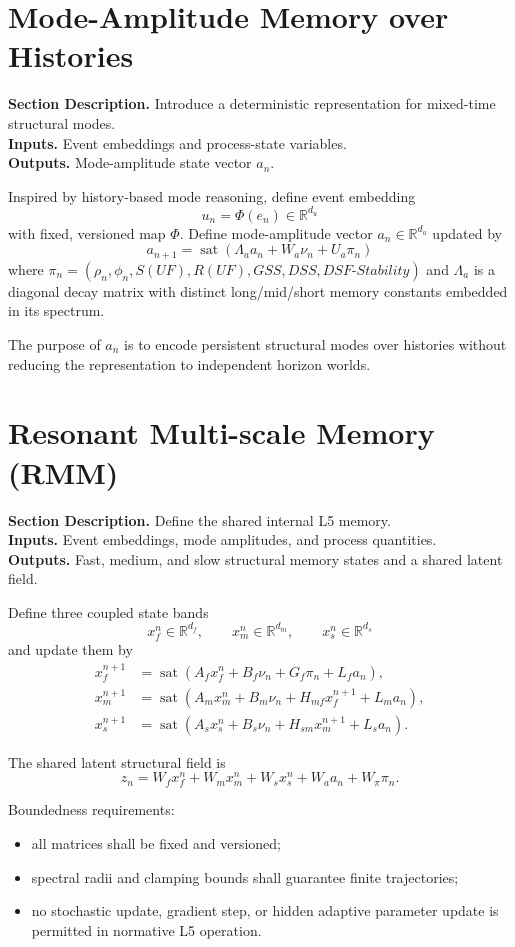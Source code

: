 \documentclass[11pt]{report}
\newcommand{\R}{\mathbb{R}}
\newcommand{\sat}{\operatorname{sat}}
\newcommand{\meta}[3]{\textbf{Section Description.} #1\\
\textbf{Inputs.} #2\\
\textbf{Outputs.} #3\par}
\begin{document}
\section{Mode-Amplitude Memory over Histories}
\meta{Introduce a deterministic representation for mixed-time structural modes.}{Event embeddings and process-state variables.}{Mode-amplitude state vector $a_n$.}

Inspired by history-based mode reasoning, define event embedding
\[
u_n = \Phi(e_n) \in \R^{d_u}
\]
with fixed, versioned map $\Phi$. Define mode-amplitude vector $a_n\in\R^{d_a}$ updated by
\[
a_{n+1} = \sat(\Lambda_a a_n + W_a \nu_n + U_a \pi_n)
\]
where $\pi_n=(\rho_n,\phi_n,S(UF),R(UF),GSS,DSS,DSF\text{-}Stability)$ and $\Lambda_a$ is a diagonal decay matrix with distinct long/mid/short memory constants embedded in its spectrum.

The purpose of $a_n$ is to encode persistent structural modes over histories without reducing the representation to independent horizon worlds.

\section{Resonant Multi-scale Memory (RMM)}
\meta{Define the shared internal L5 memory.}{Event embeddings, mode amplitudes, and process quantities.}{Fast, medium, and slow structural memory states and a shared latent field.}

Define three coupled state bands
\[
x_f^n\in\R^{d_f},\qquad x_m^n\in\R^{d_m},\qquad x_s^n\in\R^{d_s}
\]
and update them by
\begin{align*}
x_f^{n+1} &= \sat(A_f x_f^n + B_f\nu_n + G_f\pi_n + L_f a_n),\\
x_m^{n+1} &= \sat(A_m x_m^n + B_m\nu_n + H_{mf}x_f^{n+1} + L_m a_n),\\
x_s^{n+1} &= \sat(A_s x_s^n + B_s\nu_n + H_{sm}x_m^{n+1} + L_s a_n).
\end{align*}

The shared latent structural field is
\[
z_n = W_f x_f^n + W_m x_m^n + W_s x_s^n + W_a a_n + W_\pi \pi_n.
\]

Boundedness requirements:
\begin{itemize}
    \item all matrices shall be fixed and versioned;
    \item spectral radii and clamping bounds shall guarantee finite trajectories;
    \item no stochastic update, gradient step, or hidden adaptive parameter update is permitted in normative L5 operation.
\end{itemize}
\end{document}
